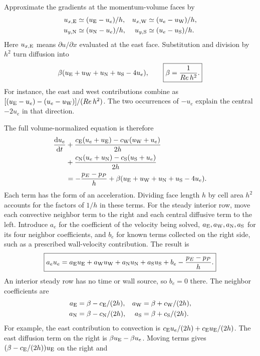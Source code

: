 Approximate the gradients at the momentum-volume faces by
\begin{align*}
u_{x,{\rm E}}&\simeq(u_{\rm E}-u_e)/h,&
u_{x,{\rm W}}&\simeq(u_e-u_{\rm W})/h,\\
u_{y,{\rm N}}&\simeq(u_{\rm N}-u_e)/h,&
u_{y,{\rm S}}&\simeq(u_e-u_{\rm S})/h.
\end{align*}
Here $u_{x,{\rm E}}$ means $\partial u/\partial x$ evaluated at the east face.
Substitution and division by $h^2$ turn diffusion into
\[
\beta(u_{\rm E}+u_{\rm W}+u_{\rm N}+u_{\rm S}-4u_e),
\qquad \boxed{\beta=\frac{1}{Re\,h^2}.}
\]
For instance, the east and west contributions combine as
$[(u_{\rm E}-u_e)-(u_e-u_{\rm W})]/(Re\,h^2)$.
The two occurrences of $-u_e$ explain the central $-2u_e$ in that direction.

The full volume-normalized equation is therefore
\begin{align*}
\frac{\mathrm du_e}{\mathrm dt}
&+\frac{c_{\rm E}(u_e+u_{\rm E})-c_{\rm W}(u_{\rm W}+u_e)}{2h}\\
&+\frac{c_{\rm N}(u_e+u_{\rm N})-c_{\rm S}(u_{\rm S}+u_e)}{2h}\\
&=-\frac{p_E-p_P}{h}
+\beta(u_{\rm E}+u_{\rm W}+u_{\rm N}+u_{\rm S}-4u_e).
\end{align*}
Each term has the form of an acceleration. Dividing face length $h$ by
cell area $h^2$ accounts for the factors of $1/h$ in these terms.
\newpage
{}
For the steady interior row, move each convective neighbor term to the right
and each central diffusive term to the left. Introduce $a_e$ for the coefficient
of the velocity being solved, $a_{\rm E},a_{\rm W},a_{\rm N},a_{\rm S}$ for
its four neighbor coefficients, and $b_e$ for known terms collected on the
right side, such as a prescribed wall-velocity contribution. The result is
\[
\boxed{a_eu_e=a_{\rm E}u_{\rm E}+a_{\rm W}u_{\rm W}
+a_{\rm N}u_{\rm N}+a_{\rm S}u_{\rm S}+b_e-\frac{p_E-p_P}{h}.}
\]
An interior steady row has no time or wall source, so $b_e=0$ there.
The neighbor coefficients are
\begin{align*}
a_{\rm E}&=\beta-c_{\rm E}/(2h),&a_{\rm W}&=\beta+c_{\rm W}/(2h),\\
a_{\rm N}&=\beta-c_{\rm N}/(2h),&a_{\rm S}&=\beta+c_{\rm S}/(2h).
\end{align*}
For example, the east contribution to convection is
$c_{\rm E}u_e/(2h)+c_{\rm E}u_{\rm E}/(2h)$.
The east diffusion term on the right is $\beta u_{\rm E}-\beta u_e$.
Moving terms gives $(\beta-c_{\rm E}/(2h))u_{\rm E}$ on the right and
